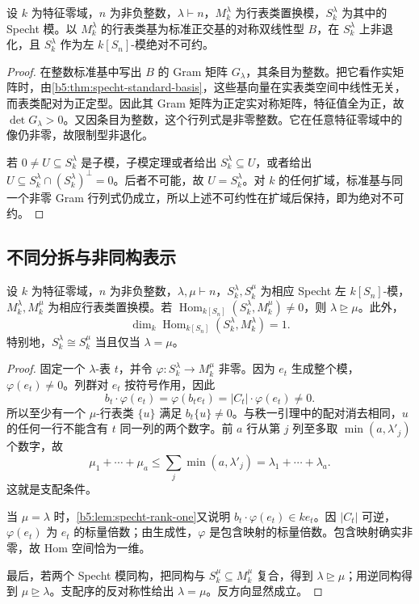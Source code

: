 \begin{proposition}\label{b5:prop:specht-char-zero-simple}
	设 \(k\) 为特征零域，\(n\) 为非负整数，\(\lambda\vdash n\)，\(M_k^\lambda\) 为行表类置换模，\(S_k^\lambda\) 为其中的 Specht 模。以 \(M_k^\lambda\) 的行表类基为标准正交基的对称双线性型 \(B\)，在 \(S_k^\lambda\) 上非退化，且 \(S_k^\lambda\) 作为左 \(k[S_n]\)-模绝对不可约。
\end{proposition}
\begin{proof}
	在整数标准基中写出 \(B\) 的 Gram 矩阵 \(G_\lambda\)，其条目为整数。把它看作实矩阵时，由\cref{b5:thm:specht-standard-basis}，这些基向量在实表类空间中线性无关，而表类配对为正定型。因此其 Gram 矩阵为正定实对称矩阵，特征值全为正，故 \(\det G_\lambda>0\)。又因条目为整数，这个行列式是非零整数。它在任意特征零域中的像仍非零，故限制型非退化。

	若 \(0\ne U\subseteq S_k^\lambda\) 是子模，子模定理或者给出 \(S_k^\lambda\subseteq U\)，或者给出 \(U\subseteq S_k^\lambda\cap(S_k^\lambda)^\perp=0\)。后者不可能，故 \(U=S_k^\lambda\)。对 \(k\) 的任何扩域，标准基与同一个非零 Gram 行列式仍成立，所以上述不可约性在扩域后保持，即为绝对不可约。
\end{proof}

\subsection{不同分拆与非同构表示}
\label{b5:subsec:0604:02}

\begin{proposition}\label{b5:prop:specht-dominance}
	设 \(k\) 为特征零域，\(n\) 为非负整数，\(\lambda,\mu\vdash n\)，\(S_k^\lambda,S_k^\mu\) 为相应 Specht 左 \(k[S_n]\)-模，\(M_k^\lambda,M_k^\mu\) 为相应行表类置换模。若 \(\operatorname{Hom}_{k[S_n]}(S_k^\lambda,M_k^\mu)\ne0\)，则 \(\lambda\trianglerighteq\mu\)。此外，
	\[
		\dim_k\operatorname{Hom}_{k[S_n]}(S_k^\lambda,M_k^\lambda)=1.
	\]
	特别地，\(S_k^\lambda\cong S_k^\mu\) 当且仅当 \(\lambda=\mu\)。
\end{proposition}
\begin{proof}
	固定一个 \(\lambda\)-表 \(t\)，并令 \(\varphi:S_k^\lambda\rightarrow M_k^\mu\) 非零。因为 \(e_t\) 生成整个模，\(\varphi(e_t)\ne0\)。列群对 \(e_t\) 按符号作用，因此
	\[
		b_t\cdot\varphi(e_t)=\varphi(b_te_t)=|C_t|\cdot\varphi(e_t)\ne0.
	\]
	所以至少有一个 \(\mu\)-行表类 \(\{u\}\) 满足 \(b_t\{u\}\ne0\)。与秩一引理中的配对消去相同，\(u\) 的任何一行不能含有 \(t\) 同一列的两个数字。前 \(a\) 行从第 \(j\) 列至多取 \(\min(a,\lambda'_j)\) 个数字，故
	\[
		\mu_1+\cdots+\mu_a \leq\sum_j\min(a,\lambda'_j) =\lambda_1+\cdots+\lambda_a.
	\]
	这就是支配条件。

	当 \(\mu=\lambda\) 时，\cref{b5:lem:specht-rank-one}又说明 \(b_t\cdot\varphi(e_t)\in ke_t\)。因 \(|C_t|\) 可逆，\(\varphi(e_t)\) 为 \(e_t\) 的标量倍数；由生成性，\(\varphi\) 是包含映射的标量倍数。包含映射确实非零，故 Hom 空间恰为一维。

	最后，若两个 Specht 模同构，把同构与 \(S_k^\mu\subseteq M_k^\mu\) 复合，得到 \(\lambda\trianglerighteq\mu\)；用逆同构得到 \(\mu\trianglerighteq\lambda\)。支配序的反对称性给出 \(\lambda=\mu\)。反方向显然成立。
\end{proof}

